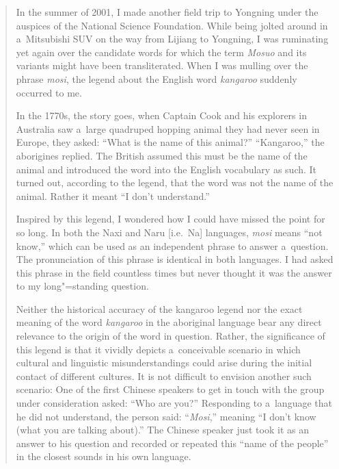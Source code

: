 \begin{quotation}
	In the summer of 2001, I made another field trip to Yongning under the auspices of the National Science Foundation. While being jolted around in a~Mitsubishi SUV on the way from Lijiang to Yongning, I was ruminating yet again over the candidate words for which the term \textit{Mosuo} and its variants might have been transliterated. When I was mulling over the phrase \textit{mosi}, the legend about the {English} word \textit{kangaroo} suddenly occurred to me.
	
	In the 1770s, the story goes, when Captain Cook and his explorers in Australia saw a~large quadruped hopping animal they had never seen in Europe, they asked: “What is the name of this animal?” “Kangaroo,” the aborigines replied. The British assumed this must be the name of the animal and introduced the word into the {English} vocabulary as such. It turned out, according to the legend, that the word was not the name of the animal. Rather it meant “I don't understand.”
	
	Inspired by this legend, I wondered how I could have missed the point for so long. In both the {Naxi} and Naru [i.e.\ Na] languages, \textit{mosi} means “not know,” which can be used as an independent phrase to answer a~{question}. The pronunciation of this phrase is identical in both languages. I had asked this phrase in the field countless times but never thought it was the answer to my long"=standing {question}.
	
	Neither the historical accuracy of the kangaroo legend nor the exact meaning of the word \textit{kangaroo} in the aboriginal language bear any direct relevance to the origin of the word in {question}. Rather, the significance of this legend is that it vividly depicts a~conceivable scenario in which cultural and linguistic misunderstandings could arise during the initial contact of different cultures. It is not difficult to envision another such scenario: One of the first Chinese speakers to get in touch with the group under consideration asked: “Who are you?” Responding to a~language that he did not understand, the person said: “\textit{Mosi},” meaning “I don't know (what you are talking about).” The Chinese speaker just took it as an answer to his {question} and recorded or repeated this “name of the people” in the closest sounds in his own language.~\citep[25--26]{shih2010}
\end{quotation}

